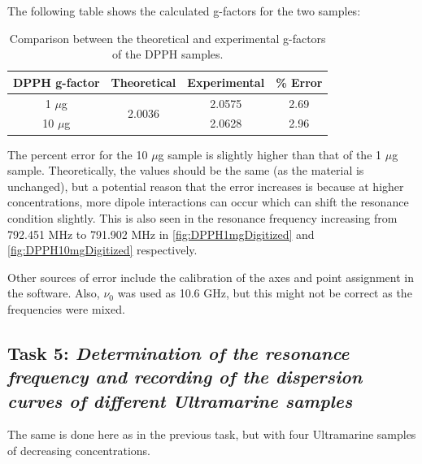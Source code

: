 \documentclass{article}
\begin{document}
The following table shows the calculated g-factors for the two samples:

\begin{table}[h]
	\centering
	\begin{tabular}{|c|c|c|c|}
	\hline
	DPPH g-factor & Theoretical             & Experimental & \% Error \\ \hline
	1 $\mu$g      & \multirow{2}{*}{2.0036} & 2.0575       & 2.69     \\ \cline{1-1} \cline{3-4} 
	10 $\mu$g     &                         & 2.0628       & 2.96     \\ \hline
	\end{tabular}
\caption{Comparison between the theoretical and experimental g-factors of the DPPH samples.}
\end{table}

The percent error for the 10 $\mu$g sample is slightly higher than that of the 1 $\mu$g sample. Theoretically, the values should be the same (as the material is unchanged), but a potential reason that the error increases is because at higher concentrations, more dipole interactions can occur which can shift the resonance condition slightly.
This is also seen in the resonance frequency increasing from 792.451 MHz to 791.902 MHz in \ref{fig:DPPH1mgDigitized} and \ref{fig:DPPH10mgDigitized} respectively.

Other sources of error include the calibration of the axes and point assignment in the software. Also, $\nu_0$ was used as 10.6 GHz, but this might not be correct as the frequencies were mixed.

\pagebreak{}

\subsection{Task 5: \textit{Determination of the resonance frequency and recording of the dispersion
curves of different Ultramarine samples}}

The same is done here as in the previous task, but with four Ultramarine samples of decreasing concentrations.
\end{document}
